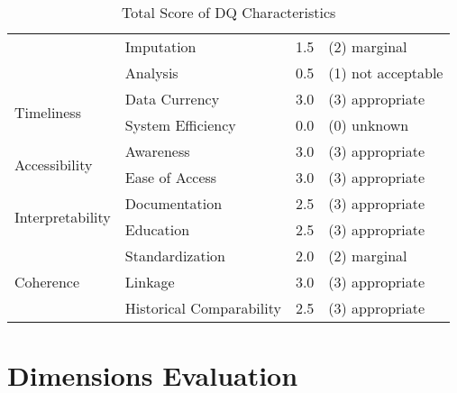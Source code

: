 \begin{table}[htbp]
\begin{tabular}{llll}
                                            & Imputation                    & 1.5               & (2) marginal          \\
                                            & Analysis                      & 0.5               & (1) not acceptable    \\ \midrule
        \multirow{2}{*}{Timeliness}         & Data Currency                 & 3.0               & (3) appropriate       \\
                                            & System Efficiency             & 0.0               & (0) unknown           \\ \midrule
        \multirow{2}{*}{Accessibility}      & Awareness                     & 3.0               & (3) appropriate       \\
                                            & Ease of Access                & 3.0               & (3) appropriate       \\ \midrule
        \multirow{2}{*}{Interpretability}   & Documentation                 & 2.5               & (3) appropriate       \\
                                            & Education                     & 2.5               & (3) appropriate       \\ \midrule
        \multirow{3}{*}{Coherence}          & Standardization               & 2.0               & (2) marginal          \\
                                            & Linkage                       & 3.0               & (3) appropriate       \\
                                            & Historical Comparability      & 2.5               & (3) appropriate       \\

        \bottomrule
    \end{tabular}

    \caption{Total Score of DQ Characteristics}
    \label{table:characteristics-score}
\end{table}
\FloatBarrier

\newpage
\section{Dimensions Evaluation}

